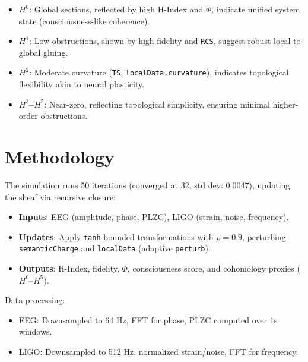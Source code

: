 \documentclass[12pt]{article}
\begin{document}
\begin{enumerate}
\begin{itemize}
        \item \textbf{$H^0$}: Global sections, reflected by high H-Index and $\Phi$, indicate unified system state (consciousness-like coherence).
        \item \textbf{$H^1$}: Low obstructions, shown by high fidelity and \texttt{RCS}, suggest robust local-to-global gluing.
        \item \textbf{$H^2$}: Moderate curvature (\texttt{TS}, \texttt{localData.curvature}), indicates topological flexibility akin to neural plasticity.
        \item \textbf{$H^3$--$H^5$}: Near-zero, reflecting topological simplicity, ensuring minimal higher-order obstructions.
    \end{itemize}
\end{enumerate}

\section*{Methodology}
The simulation runs 50 iterations (converged at 32, std dev: 0.0047), updating the sheaf via recursive closure:
\begin{itemize}
    \item \textbf{Inputs}: EEG (amplitude, phase, PLZC), LIGO (strain, noise, frequency).
    \item \textbf{Updates}: Apply \texttt{tanh}-bounded transformations with $\rho = 0.9$, perturbing \texttt{semanticCharge} and \texttt{localData} (adaptive \texttt{perturb}).
    \item \textbf{Outputs}: H-Index, fidelity, $\Phi$, consciousness score, and cohomology proxies ($H^0$--$H^5$).
\end{itemize}

Data processing:
\begin{itemize}
    \item EEG: Downsampled to 64 Hz, FFT for phase, PLZC computed over 1s windows.
    \item LIGO: Downsampled to 512 Hz, normalized strain/noise, FFT for frequency.
\end{itemize}
\end{document}
